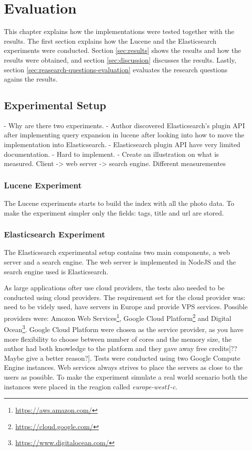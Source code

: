 \chapter{Evaluation}
\label{ch:evaluation}
This chapter explains how the implementations were tested together with the results.
The first section explains how the Lucene and the Elasticsearch experiments were conducted.
Section \ref{sec:results} shows the results and how the results were obtained,
and section \ref{sec:discussion} discusses the results.
Lastly, section \ref{sec:reasearch-questions-evaluation} evaluates the research questions agains the results.

\section{Experimental Setup}
- Why are there two experiments.
- Author discovered Elasticsearch's plugin API after implementing query expansion in lucene after looking into how to move the implementation into Elasticsearch.
- Elasticsearch plugin API have very limited documentation.
- Hard to implement.
- Create an illustration on what is measured. Client -> web server -> search engine. Different measurementes

\subsection{Lucene Experiment}
The Lucene experiments starts to build the index with all the photo data.
To make the experiment simpler only the fields: tags, title and url are stored.

\subsection{Elasticsearch Experiment}
The Elasticsearch experimental setup contains two main components, a web server and a search engine.
The web server is implemented in NodeJS and the search engine used is Elasticsearch.

As large applications ofter use cloud providers, the tests also needed to be conducted using cloud providers.
The requirement set for the cloud provider was: need to be videly used, have servers in Europe and provide VPS services.
Possible providers were: Amozon Web Services\footnote{\url{https://aws.amazon.com/}},
Google Cloud Platform\footnote{\url{https://cloud.google.com/}} and Digital Ocean\footnote{\url{https://www.digitalocean.com/}}.
Google Cloud Platform were chosen as the service provider, as you have more flexibility to choose between number of cores and the memory size,
the author had both knowledge to the platform and they gave away free credits[?? Maybe give a better reason?].
Tests were conducted using two Google Compute Engine instances.
Web services always strives to place the servers as close to the users as possible.
To make the experiment simulate a real world scenario both the instances were placed in the reagion called \textit{europe-west1-c}.


